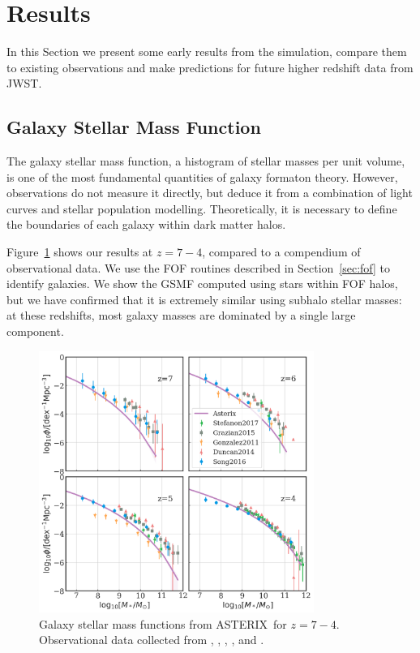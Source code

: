 \documentclass[fleqn,usenatbib]{mnras}
\newcommand{\software}[1]{{\small #1}}
\newcommand{\asterix}{\software{ASTERIX}}
\begin{document}
\section{Results}

In this Section we present some early results from the simulation, compare them to existing observations and make predictions for future higher redshift data from JWST.

\subsection{Galaxy Stellar Mass Function}

The galaxy stellar mass function, a histogram of stellar masses per unit volume, is one of the most fundamental quantities of galaxy formaton theory. However, observations do not measure it directly, but deduce it from a combination of light curves and stellar population modelling. Theoretically, it is necessary to define the boundaries of each galaxy within dark matter halos.

Figure~\ref{fig:GSMF} shows our results at $z=7 - 4$, compared to a compendium of observational data. We use the FOF routines described in Section~\ref{sec:fof} to identify galaxies. We show the GSMF computed using stars within FOF halos, but we have confirmed that it is extremely similar using subhalo stellar masses: at these redshifts, most galaxy masses are dominated by a single large component.

\begin{figure}
\centering
  \includegraphics[width=0.8\textwidth]{plots/GSMF-z7-z4.png}
  \caption{Galaxy stellar mass functions from \asterix~for $z=7-4$. Observational data collected from \citet{Gonzalez2011}, \citet{Duncan2014}, \citet{Grazian2015}, \citet{Song2016}, and \citet{Stefanon2017}.}
  \label{fig:GSMF}
\end{figure}
\end{document}
